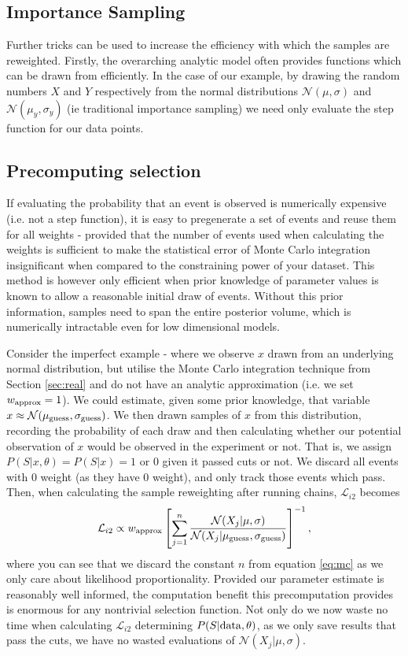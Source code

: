 \documentclass[a4paper,fleqn,usenatbib]{mnras}
\begin{document}
\subsection{Importance Sampling}
Further tricks can be used to increase the efficiency with which the samples are reweighted. Firstly, the overarching analytic model often provides functions which can be drawn from efficiently. In the case of our example, by drawing the random numbers $X$ and $Y$ respectively from the normal distributions $\mathcal{N}(\mu,\sigma)$ and $\mathcal{N}(\mu_y,\sigma_y)$ (ie traditional importance sampling) we need only evaluate the step function for our data points.

\subsection{Precomputing selection}
If evaluating the probability that an event is observed is numerically expensive (i.e. not a step function), it is easy to pregenerate a set of events and reuse them for all weights - provided that the number of events used when calculating the weights is sufficient to make the statistical error of Monte Carlo integration insignificant when compared to the constraining power of your dataset. This method is however only efficient when prior knowledge of parameter values is known to allow a reasonable initial draw of events. Without this prior information, samples need to span the entire posterior volume, which is numerically intractable even for low dimensional models. 

Consider the imperfect example - where we observe $x$ drawn from an underlying normal distribution, but utilise the Monte Carlo integration technique from Section \ref{sec:real} and do not have an analytic approximation (i.e. we set $w_{\rm approx} =1$). We could estimate, given some prior knowledge, that variable $x \approx \mathcal{N}(\mu_{\rm guess}, \sigma_{\rm guess})$. We then drawn samples of $x$ from this distribution, recording the probability of each draw and then calculating whether our potential observation of $x$ would be observed in the experiment or not. That is, we assign $P(S|x,\theta) = P(S|x) = 1$ or $0$ given it passed cuts or not. We discard all events with $0$ weight (as they have $0$ weight), and only track those events which pass. Then, when calculating the sample reweighting after running chains, $\mathcal{L}_{i2}$ becomes
\begin{align}
\mathcal{L}_{i2} \propto w_{\rm approx}  \left[\sum_{j=1}^{n} \frac{\mathcal{N}(X_j | \mu, \sigma)}{\mathcal{N}(X_j | \mu_{\rm guess}, \sigma_{\rm guess})} \right]^{-1},
\end{align} 
where you can see that we discard the constant $n$ from equation \eqref{eq:mc} as we only care about likelihood proportionality. Provided our parameter estimate is reasonably well informed, the computation benefit this precomputation provides is enormous for any nontrivial selection function. Not only do we now waste no time when calculating $\mathcal{L}_{i2}$ determining $P(S|{\rm data}, \theta)$, as we only save results that pass the cuts, we have no wasted evaluations of $\mathcal{N}(X_j | \mu, \sigma)$.
\end{document}
